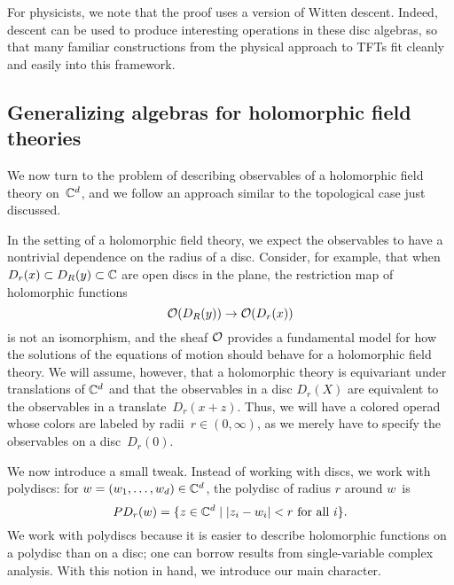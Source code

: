 \documentclass[11pt]{amsart}
\begin{document}
For physicists, we note that the proof uses a version of Witten descent.
Indeed, descent can be used to produce interesting operations in these disc algebras,
so that many familiar constructions from the physical approach to TFTs fit cleanly and easily into this framework.

\subsection{Generalizing algebras for holomorphic field theories}

We now turn to the problem of describing observables of a holomorphic field theory on~$\mathbb C^d$,
and we follow an approach similar to the topological case just discussed.

In the setting of a holomorphic field theory, we expect the observables to have a nontrivial dependence on the radius of a disc.
Consider, for example, that 
when $D_r(x) \subset D_R(y) \subset \mathbb C$ are open discs in the plane,
the restriction map of holomorphic functions
\[
\mathcal O(D_R(y))\to \mathcal O(D_r(x))
\]
is not an isomorphism,
and the sheaf $\mathcal O$ provides a fundamental model for how the solutions of the equations of motion should behave for a holomorphic field theory.
We will assume, however, that a holomorphic theory is equivariant under translations of $\mathbb C^d$ and that the observables in a disc $D_r(X)$ are equivalent to the observables in a translate~$D_r(x+z)$.
Thus, we will have a colored operad whose colors are labeled by radii~$r \in (0,\infty)$,
as we merely have to specify the observables on a disc~$D_r(0)$.

We now introduce a small tweak.
Instead of working with discs, we work with polydiscs: for $w = (w_1, \ldots, w_d) \in \mathbb C^d$, the polydisc of radius $r$ around $w$~is
\[
PD_r(w) = \{ z \in \mathbb C^d \;|\; |z_i - w_i| < r \text{ for all $i$}\}.
\]
We work with polydiscs because it is easier to describe holomorphic functions on a polydisc than on a disc;
one can borrow results from single-variable complex analysis.
With this notion in hand, we introduce our main character.
\end{document}

